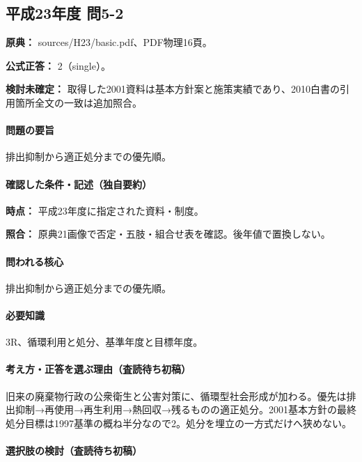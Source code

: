 \subsection{平成23年度 問5-2}
\label{q:h23-reg-basic-5-2}

\noindent\textbf{原典：} sources/H23/basic.pdf、PDF物理16頁。

\textbf{公式正答：} 2（single）。

\par\textbf{検討未確定：} 取得した2001資料は基本方針案と施策実績であり、2010白書の引用箇所全文の一致は追加照合。

\paragraph{問題の要旨} 排出抑制から適正処分までの優先順。

\paragraph{確認した条件・記述（独自要約）}\mbox{}\par

\noindent\textbf{時点：} 平成23年度に指定された資料・制度。\par

\noindent\textbf{照合：} 原典21画像で否定・五肢・組合せ表を確認。後年値で置換しない。\par

\paragraph{問われる核心} 排出抑制から適正処分までの優先順。

\paragraph{必要知識} 3R、循環利用と処分、基準年度と目標年度。

\paragraph{考え方・正答を選ぶ理由（査読待ち初稿）} 旧来の廃棄物行政の公衆衛生と公害対策に、循環型社会形成が加わる。優先は排出抑制→再使用→再生利用→熱回収→残るものの適正処分。2001基本方針の最終処分目標は1997基準の概ね半分なので2。処分を埋立の一方式だけへ狭めない。

\paragraph{選択肢の検討（査読待ち初稿）}\mbox{}\par

